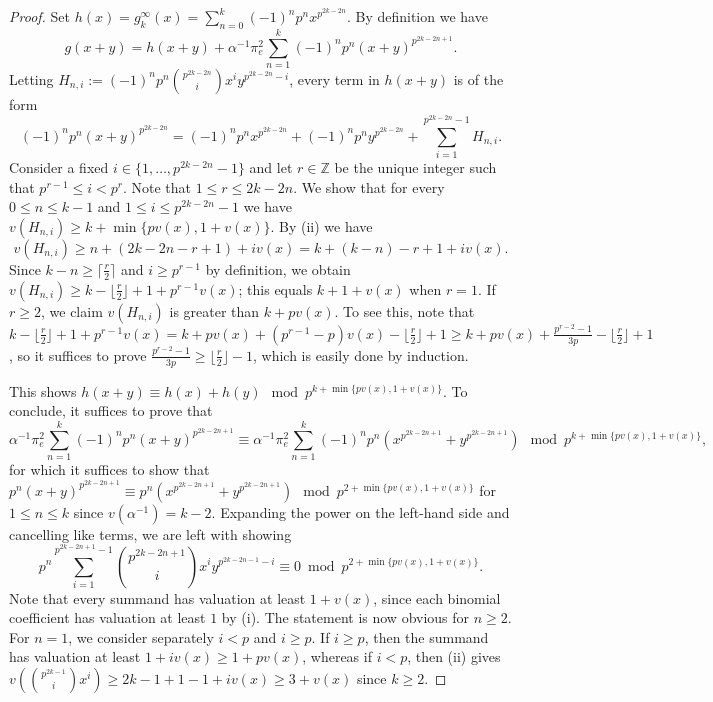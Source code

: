\documentclass{amsart}
\theoremstyle{definition}
\newcommand{\Z}{\mathbb{Z}}
\numberwithin{theorem}{section}
\numberwithin{equation}{section}
\begin{document}
\begin{proof}
Set $h(x) = g_k^\infty(x) = \sum_{n=0}^{k} (-1)^np^n x^{p^{2k-2n}}$. By definition we have $$g(x+y) = h(x+y) + \alpha^{-1}\pi_e^2 \sum_{n=1}^k (-1)^n p^n (x+y)^{p^{2k-2n+1}}.$$
Letting $H_{n,i} := (-1)^n p^n \binom{p^{2k-2n}}{i}x^i y^{p^{2k-2n}-i}$, every term in $h(x+y)$ is of the form
\[
(-1)^n p^n (x+y)^{p^{2k-2n}} = (-1)^n p^n x^{p^{2k-2n}} + (-1)^n p^n y^{p^{2k-2n}} + \sum_{i=1}^{p^{2k-2n}-1} H_{n,i}.
\]
Consider a fixed $i \in \{1,\ldots,p^{2k-2n}-1\}$ and let $r \in \Z$ be the unique integer such that $p^{r-1} \le i < p^r$. Note that $1 \le r \le 2k-2n$. We show that for every $0 \le n \le k-1$ and $1 \le i \le p^{2k-2n}-1$ we have $v(H_{n,i}) \ge k+\min\{pv(x), 1 + v(x)\}$. By (ii) we have
$$v(H_{n,i}) \ge n + (2k-2n-r+1) + iv(x) = k + (k-n) - r + 1 + iv(x).$$
Since $k-n \geq \lceil \frac{r}{2} \rceil$ and $i \geq p^{r-1}$ by definition, we obtain $v(H_{n,i}) \ge k - \lfloor \frac{r}{2} \rfloor + 1 + p^{r-1}v(x)$; this equals $k+1+v(x)$ when $r = 1$. If $r \geq 2$, we claim $v(H_{n,i})$ is greater than $k+pv(x)$. To see this, note that $k- \lfloor \frac{r}{2} \rfloor + 1 + p^{r-1}v(x) = k+pv(x) + (p^{r-1}-p)v(x) - \lfloor \frac{r}{2} \rfloor + 1 \geq k+pv(x) + \frac{p^{r-2}-1}{3p} - \lfloor \frac{r}{2} \rfloor + 1$, so it suffices to prove $\frac{p^{r-2}-1}{3p}  \geq \lfloor \frac{r}{2} \rfloor - 1$, which is easily done by induction.
    
This shows $h(x+y) \equiv h(x) + h(y) \mod p^{k + \min\{pv(x), 1+v(x)\}}$. To conclude, it suffices to prove that $$\alpha^{-1}\pi_e^2 \sum_{n=1}^k (-1)^n p^n (x+y)^{p^{2k-2n+1}} \equiv \alpha^{-1}\pi_e^2 \sum_{n=1}^k (-1)^n p^n (x^{p^{2k-2n+1}} + y^{p^{2k-2n+1}}) \mod p^{k + \min\{pv(x), 1+v(x)\}},$$
    for which it suffices to show that $p^n (x+y)^{p^{2k-2n+1}} \equiv p^n (x^{p^{2k-2n+1}} + y^{p^{2k-2n+1}}) \mod p^{2+\min\{pv(x),1+v(x)\}}$ for $1 \leq n \leq k$ since $v(\alpha^{-1})=k-2.$
    Expanding the power on the left-hand side and cancelling like terms, we are left with showing
\[
p^n \sum_{i=1}^{p^{2k-2n+1}-1} {p^{2k-2n+1} \choose i} x^i y^{p^{2k-2n-1}-i} \equiv 0 \bmod{p^{2+\min\{p v(x), 1+v(x) \}}}.
\]
Note that every summand has valuation at least $1+v(x)$, since each binomial coefficient has valuation at least $1$ by (i). The statement is now obvious for $n \geq 2$. For $n=1$, we consider separately $i < p$ and $i \geq p$. If $i \geq p$, then the summand has valuation at least $1+iv(x) \geq 1+pv(x)$, whereas if $i <p$, then (ii) gives $v(\binom{p^{2k-1}}{i}x^i) \geq 2k-1+1-1 + iv(x) \geq 3 +v(x)$ since $k \geq 2$.
\end{proof}
\end{document}

